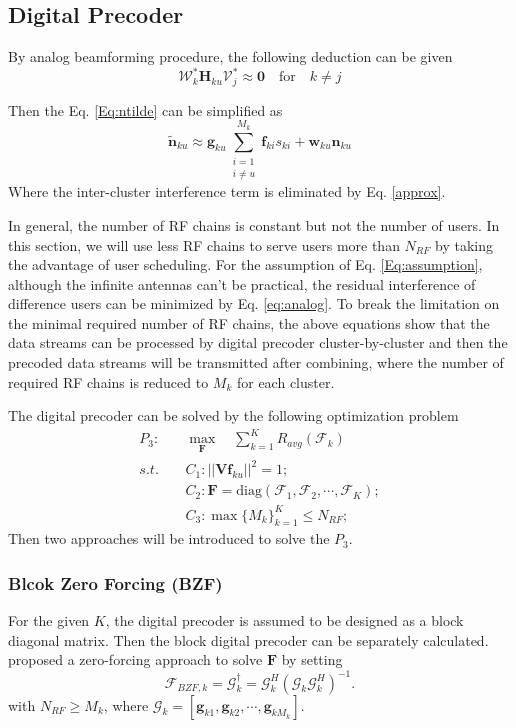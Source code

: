 \documentclass[conference]{IEEEtran}
\begin{document}
\subsection{Digital Precoder}
By analog beamforming procedure, the following deduction can be given
\begin{equation}\label{approx}
\bm{\mathcal{W}}^*_{k}\bm{H}_{ku}\bm{\mathcal{V}}^*_{j} \approx \bm{0} \quad \text{for} \quad k \neq j
\end{equation}

Then the Eq. \eqref{Eq:ntilde} can be simplified as 
\begin{equation}
\tilde{\bm{n}}_{ku} \approx	\bm{g}_{ku}\sum_{\substack{i=1\\i\neq u}}^{M_k}\bm{f}_{ki}s_{ki}+\bm{w}_{ku}\bm{n}_{ku}
\end{equation}
Where the inter-cluster interference term is eliminated by Eq. \eqref{approx}.

In general, the number of RF chains is constant but not the number of users. In this section, we will use less RF chains to serve users more than $N_{RF}$ by taking the advantage of user scheduling. For the assumption of Eq. \eqref{Eq:assumption},  although the infinite antennas can't be practical, the residual interference of difference users can be minimized by Eq. \eqref{eq:analog}. To break the limitation on the minimal required number of RF chains, the above equations show that the data streams can be processed by digital precoder cluster-by-cluster and then the precoded data streams will be transmitted after combining, where the number of required RF chains is reduced to $M_k$ for each cluster.  

The digital precoder can be solved by the following optimization problem
\begin{align}\label{eq:digital}
P_3: \quad&\max_{\bm F}\quad \sum_{k=1}^{K} R_{avg}(\bm{\mathcal{F}}_k)\\ \nonumber
s.t. \quad &C_1: ||\bm{Vf}_{ku}||^2=1;\nonumber\\
&C_2: \bm{F} = \text{diag}(\bm{\mathcal{F}}_1, \bm{\mathcal{F}}_2, \cdots, \bm{\mathcal{F}}_{K});\nonumber\\
&C_3: \max \{M_k\}_{k=1}^K \leq N_{RF};\nonumber
\end{align}
Then two approaches will be introduced to solve the $P_3$.

\subsubsection{Blcok Zero Forcing (BZF)}
For the given $K$, the digital precoder is assumed to be designed as a block diagonal matrix. Then the block digital precoder can be separately calculated. \cite{alkhateeb2014channel} proposed a zero-forcing approach to solve $\bm{F}$ by setting
\begin{equation}
\bm{\mathcal{F}}_{BZF,k} = \bm{\mathcal{G}}_k^\dagger = \bm{\mathcal{G}}_k^H (\bm{\mathcal{G}}_k \bm{\mathcal{G}}_k^H)^{-1}.
\end{equation}
with $N_{RF}\geq M_k$, where $\bm{\mathcal{G}}_k = [\bm{g}_{k1}, \bm{g}_{k2},\cdots,\bm{g}_{kM_k}]$.
\end{document}
